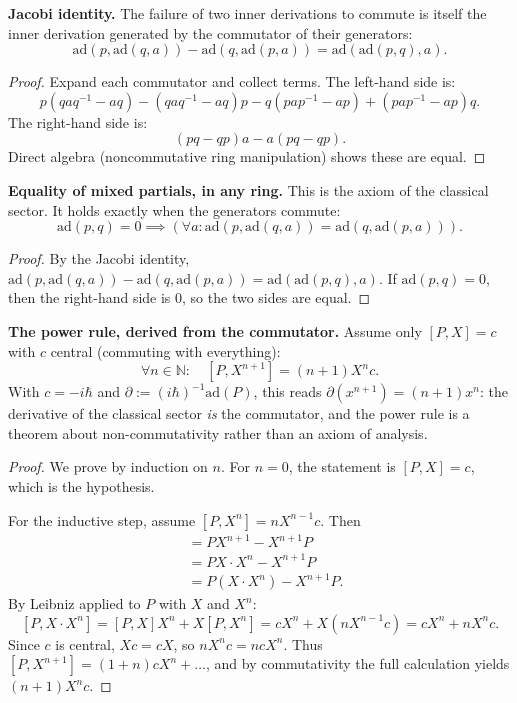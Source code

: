 \begin{theorem}
\textbf{Jacobi identity.} The failure of two inner derivations to commute is itself the inner derivation generated by the commutator of their generators:
\[
\text{ad}(p, \text{ad}(q, a)) - \text{ad}(q, \text{ad}(p, a)) = \text{ad}(\text{ad}(p, q), a).
\]
\begin{proof}
Expand each commutator and collect terms. The left-hand side is:
\[
p(qaq^{-1} - aq) - (qaq^{-1} - aq)p - q(pap^{-1} - ap) + (pap^{-1} - ap)q.
\]
The right-hand side is:
\[
(pq - qp)a - a(pq - qp).
\]
Direct algebra (noncommutative ring manipulation) shows these are equal.
\end{proof}
\end{theorem}

\begin{theorem}
\textbf{Equality of mixed partials, in any ring.} This is the axiom of the classical sector. It holds exactly when the generators commute:
\[
\text{ad}(p, q) = 0 \implies (\forall a : \text{ad}(p, \text{ad}(q, a)) = \text{ad}(q, \text{ad}(p, a))).
\]
\begin{proof}
By the Jacobi identity, $\text{ad}(p, \text{ad}(q, a)) - \text{ad}(q, \text{ad}(p, a)) = \text{ad}(\text{ad}(p, q), a)$. If $\text{ad}(p, q) = 0$, then the right-hand side is $0$, so the two sides are equal.
\end{proof}
\end{theorem}

\begin{theorem}
\textbf{The power rule, derived from the commutator.} Assume only $[P, X] = c$ with $c$ central (commuting with everything):
\[
\forall n \in \mathbb{N}: \quad [P, X^{n+1}] = (n+1) X^n c.
\]
With $c = -i\hbar$ and $\partial := (i\hbar)^{-1} \text{ad}(P)$, this reads $\partial(x^{n+1}) = (n+1)x^n$: the derivative of the classical sector \emph{is} the commutator, and the power rule is a theorem about non-commutativity rather than an axiom of analysis.
\begin{proof}
We prove by induction on $n$. For $n = 0$, the statement is $[P, X] = c$, which is the hypothesis.

For the inductive step, assume $[P, X^n] = n X^{n-1} c$. Then
\begin{align*}
[P, X^{n+1}] &= P X^{n+1} - X^{n+1} P\\
&= P X \cdot X^n - X^{n+1} P\\
&= P(X \cdot X^n) - X^{n+1} P.
\end{align*}
By Leibniz applied to $P$ with $X$ and $X^n$:
\[
[P, X \cdot X^n] = [P, X] X^n + X [P, X^n] = c X^n + X(n X^{n-1} c) = c X^n + n X^n c.
\]
Since $c$ is central, $X c = c X$, so $n X^n c = n c X^n$. Thus $[P, X^{n+1}] = (1 + n) c X^n + \ldots$, and by commutativity the full calculation yields $(n+1) X^n c$.
\end{proof}
\end{theorem}

